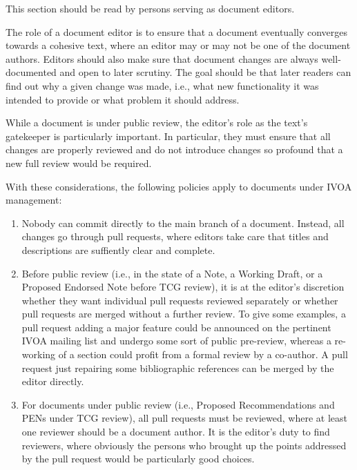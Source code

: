 \documentclass[11pt,a4paper]{ivoa}
\begin{document}
This section should be read by persons serving as document editors.

The role of a document editor is to ensure that a document eventually
converges towards a cohesive text, where an editor may or may not be one
of the document authors.  Editors should also make sure that
document changes are always well-documented and open to later scrutiny.
The goal should be that later readers can find out why a given change
was made, i.e., what new functionality it was intended to provide or
what problem it should address.

While a document is under public review, the editor's role as the text's
gatekeeper is particularly important.  In particular, they must ensure
that all changes are properly reviewed and do not introduce changes so
profound that a new full review would be required.

With these considerations, the following policies apply to documents
under IVOA management:

\begin{enumerate}
\renewcommand\theenumi{\alph{enumi}}
\item Nobody can commit directly to the main branch of a document.
Instead, all changes go through pull requests, where editors take care
that titles and descriptions are suffiently clear and complete.

\item Before public review (i.e., in the state of a Note, a Working
Draft, or a Proposed Endorsed Note before TCG review), it is at the
editor's discretion whether they want individual pull requests reviewed
separately or whether pull requests are merged without a further review.
To give some examples, a pull request adding a major feature could be
announced on the pertinent IVOA mailing list and undergo some sort of
public pre-review, whereas a re-working of a section could profit from a
formal review by a co-author.  A pull request just repairing some
bibliographic references can be merged by the editor directly.

\item For documents under public review (i.e., Proposed Recommendations
and PENs under TCG review), all pull requests must be reviewed, where at
least one reviewer should be a document author.  It is the editor's duty
to find reviewers, where obviously the persons who brought up the points
addressed by the pull request would be particularly good choices.
\end{enumerate}
\end{document}
